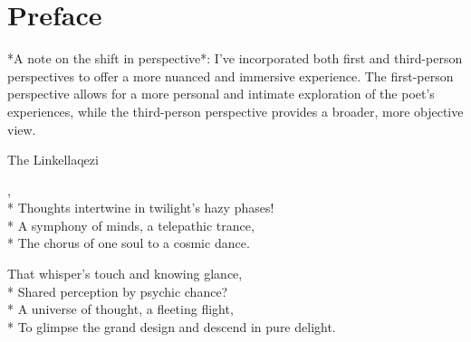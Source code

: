 \documentclass[12pt]{book}
\begin{document}
    \maketitle
    \makededication

    \frontmatter

    \maketoc

    \renewcommand*{\topname}{Poems} %
    \maketop

    \section{Preface}
    *A note on the shift in perspective*: I've incorporated both first and third-person perspectives to offer a more
    nuanced and immersive experience. The first-person perspective allows for a more personal and intimate exploration
    of the poet's experiences, while the third-person perspective provides a broader, more objective view.

    \newpage
    \thispagestyle{empty}

    \mainmatter

    \begin{poem}{The Link}{ellaqezi}

        \settowidth{\versewidth}{To glimpse the grand design and descend in pure delight.}

        \begin{altverse}
            ,\\*
            Thoughts intertwine in twilight's hazy phases!\\*
            A symphony of minds, a telepathic trance,\\*
            The chorus of one soul to a cosmic dance.
        \end{altverse}

        \begin{altverse}
            That whisper's touch and knowing glance,\\*
            Shared perception by psychic chance?\\*
            A universe of thought, a fleeting flight,\\*
            To glimpse the grand design and descend in pure delight.
        \end{altverse}

    \end{poem}
\end{document}
